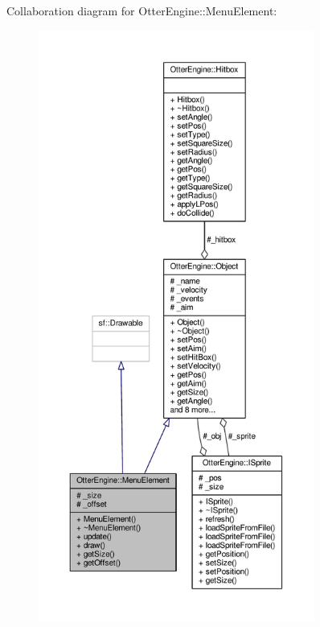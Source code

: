 Collaboration diagram for Otter\+Engine\+:\+:Menu\+Element\+:\nopagebreak
\begin{figure}[H]
\begin{center}
\leavevmode
\includegraphics[height=550pt]{da/dac/class_otter_engine_1_1_menu_element__coll__graph}
\end{center}
\end{figure}

